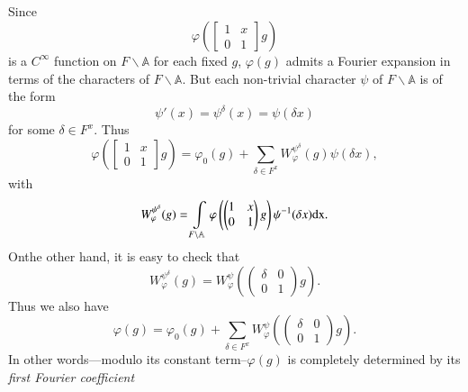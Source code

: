 \subsection{}\label{art1-sec10.1}
Since
$$
\varphi\left(\begin{bmatrix} 1 & x\\ 0 & 1\end{bmatrix}g\right)
$$
is a $C^{\infty}$ function on $F\backslash \mathbb{A}$ for each fixed $g$, $\varphi(g)$ admits a Fourier expansion in terms of the characters of $F\backslash \mathbb{A}$. But each non-trivial character $\psi$ of $F\backslash \mathbb{A}$ is of the form
\setcounter{equation}{0}
\begin{equation}
\psi'(x)=\psi^{\delta}(x)=\psi(\delta x)\label{art1-eq10.1.1}
\end{equation}
for some $\delta\in F^{x}$. Thus
\begin{equation}
\varphi \left(\begin{bmatrix} 1 & x\\ 0 & 1\end{bmatrix}g\right)=\varphi_{0}(g)+\sum\limits_{\delta\in F^{x}}W^{\psi^{\delta}}_{\varphi}(g)\psi (\delta x),\label{art1-eq10.1.2}
\end{equation}
with
\begin{equation}
W^{\psi^{\delta}}_{\varphi}(g)=\int\limits_{F\backslash \mathbb{A}}\varphi \left(\left(\begin{matrix} 1 & x\\ 0 & 1\end{matrix}\right)g\right)\psi^{-1}(\delta x)\mathrm{dx}.\label{art1-eq10.1.3}
\end{equation}
On\pageoriginale the other hand, it is easy to check that
\begin{equation}
W^{\psi^{\delta}}_{\varphi}(g)=W^{\psi}_{\varphi}\left(\left(\begin{matrix}\delta & 0\\ 0 & 1\end{matrix}\right)g\right).\label{art1-eq10.1.4}
\end{equation}
Thus we also have
\begin{equation}
\varphi (g)=\varphi_{0}(g)+\sum\limits_{\delta \in F^{x}}W^{\psi}_{\varphi}\left(\left(\begin{matrix} \delta & 0\\ 0 & 1\end{matrix}\right)g\right).\label{art1-eq10.1.5}
\end{equation}
In other words---modulo its constant term--$\varphi(g)$ is completely determined by its {\em first Fourier coefficient}
